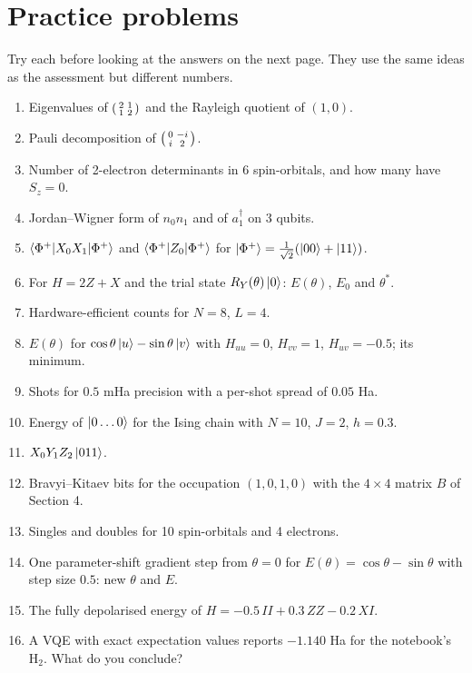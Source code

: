 \documentclass[11pt,a4paper,openany]{book}
\begin{document}
\section{Practice problems}
Try each before looking at the answers on the next page. They use the same ideas as the assessment but different numbers.
\begin{enumerate}[label=\textbf{P\arabic*.}, leftmargin=2.6em, itemsep=3pt]
\item Eigenvalues of $\begin{psmallmatrix}2&1\\1&2\end{psmallmatrix}$ and the Rayleigh quotient of $(1, 0)$.
\item Pauli decomposition of $\begin{psmallmatrix}0 & -i\\ i & 2\end{psmallmatrix}$.
\item Number of 2-electron determinants in 6 spin-orbitals, and how many have $S_z = 0$.
\item Jordan--Wigner form of $n_0n_1$ and of $a_1^\dagger$ on 3 qubits.
\item $\braket{\Phi^+|X_0X_1|\Phi^+}$ and $\braket{\Phi^+|Z_0|\Phi^+}$ for $\ket{\Phi^+} = \frac{1}{\sqrt2}(\ket{00} + \ket{11})$.
\item For $H = 2Z + X$ and the trial state $R_Y(\theta)\ket0$: $E(\theta)$, $E_0$ and $\theta^*$.
\item Hardware-efficient counts for $N = 8$, $L = 4$.
\item $E(\theta)$ for $\cos\theta\ket u - \sin\theta\ket v$ with $H_{uu} = 0$, $H_{vv} = 1$, $H_{uv} = -0.5$; its minimum.
\item Shots for $0.5$ mHa precision with a per-shot spread of $0.05$ Ha.
\item Energy of $\ket{0\dots0}$ for the Ising chain with $N = 10$, $J = 2$, $h = 0.3$.
\item $X_0Y_1Z_2\ket{011}$.
\item Bravyi--Kitaev bits for the occupation $(1, 0, 1, 0)$ with the $4\times4$ matrix $B$ of Section 4.
\item Singles and doubles for 10 spin-orbitals and 4 electrons.
\item One parameter-shift gradient step from $\theta = 0$ for $E(\theta) = \cos\theta - \sin\theta$ with step size $0.5$: new $\theta$ and $E$.
\item The fully depolarised energy of $H = -0.5\,II + 0.3\,ZZ - 0.2\,XI$.
\item A VQE with exact expectation values reports $-1.140$ Ha for the notebook's H$_2$. What do you conclude?
\end{enumerate}
\end{document}
